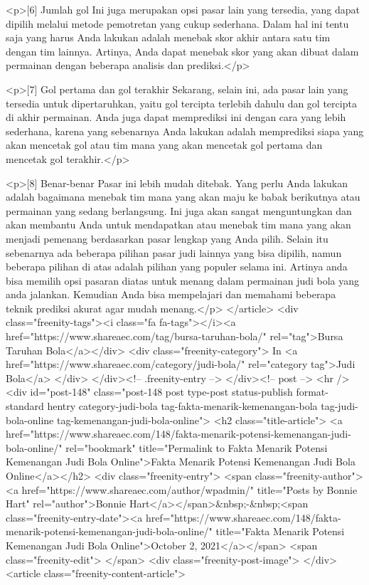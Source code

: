 {<p>[6] Jumlah gol Ini juga merupakan opsi pasar lain yang tersedia, yang dapat dipilih melalui metode pemotretan yang cukup sederhana. Dalam hal ini tentu saja yang harus Anda lakukan adalah menebak skor akhir antara satu tim dengan tim lainnya. Artinya, Anda dapat menebak skor yang akan dibuat dalam permainan dengan beberapa analisis dan prediksi.</p>



<p>[7] Gol pertama dan gol terakhir Sekarang, selain ini, ada pasar lain yang tersedia untuk dipertaruhkan, yaitu gol tercipta terlebih dahulu dan gol tercipta di akhir permainan. Anda juga dapat memprediksi ini dengan cara yang lebih sederhana, karena yang sebenarnya Anda lakukan adalah memprediksi siapa yang akan mencetak gol atau tim mana yang akan mencetak gol pertama dan mencetak gol terakhir.</p>



<p>[8] Benar-benar Pasar ini lebih mudah ditebak. Yang perlu Anda lakukan adalah bagaimana menebak tim mana yang akan maju ke babak berikutnya atau permainan yang sedang berlangsung. Ini juga akan sangat menguntungkan dan akan membantu Anda untuk mendapatkan atau menebak tim mana yang akan menjadi pemenang berdasarkan pasar lengkap yang Anda pilih. Selain itu sebenarnya ada beberapa pilihan pasar judi lainnya yang bisa dipilih, namun beberapa pilihan di atas adalah pilihan yang populer selama ini. Artinya anda bisa memilih opsi pasaran diatas untuk menang dalam permainan judi bola yang anda jalankan. Kemudian Anda bisa mempelajari dan memahami beberapa teknik prediksi akurat agar mudah menang.</p>
									</article>
																			<div class="freenity-tags"><i class="fa fa-tags"></i><a href="https://www.shareaec.com/tag/bursa-taruhan-bola/" rel="tag">Bursa Taruhan Bola</a></div>
																			<div class="freenity-category">
											In <a href="https://www.shareaec.com/category/judi-bola/" rel="category tag">Judi Bola</a>										</div>
																	</div><!-- .freenity-entry -->
							</div><!-- post -->
							<hr />
													<div id="post-148" class="post-148 post type-post status-publish format-standard hentry category-judi-bola tag-fakta-menarik-kemenangan-bola tag-judi-bola-online tag-kemenangan-judi-bola-online">
								<h2 class="title-article">
									<a href="https://www.shareaec.com/148/fakta-menarik-potensi-kemenangan-judi-bola-online/" rel="bookmark" title="Permalink to Fakta Menarik Potensi Kemenangan Judi Bola Online">Fakta Menarik Potensi Kemenangan Judi Bola Online</a></h2>
								<div class="freenity-entry">
									<span class="freenity-author"><a href="https://www.shareaec.com/author/wpadmin/" title="Posts by Bonnie Hart" rel="author">Bonnie Hart</a></span>&nbsp;-&nbsp;<span class="freenity-entry-date"><a href="https://www.shareaec.com/148/fakta-menarik-potensi-kemenangan-judi-bola-online/" title="Fakta Menarik Potensi Kemenangan Judi Bola Online">October 2, 2021</a></span>
									<span class="freenity-edit"> </span>
									<div class="freenity-post-image">  </div>
																		<article class="freenity-content-article">
										
}
